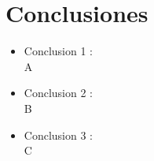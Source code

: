\documentclass[preprint,12pt]{elsarticle}
\begin{document}
\section{Conclusiones}

\begin{itemize}

\item Conclusion 1 : \\ A

\item Conclusion 2 : \\ B

\item Conclusion 3 : \\ C

\end{itemize}


	
	\newpage
	
		 
	
	
\end{document}
